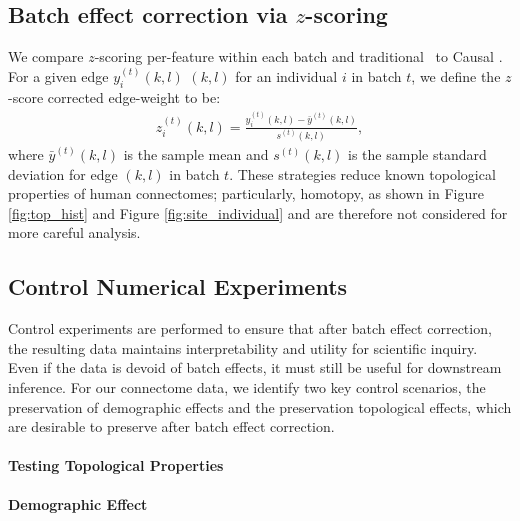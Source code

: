 \subsection{Batch effect correction via $z$-scoring}

We compare $z$-scoring per-feature within each batch \cite{Lazar2013Jul} and traditional \Combat\ to Causal \Combat. For a given edge $y_{i}^{(t)}(k,l)$ $(k, l)$ for an individual $i$ in batch $t$, we define the $z$-score corrected edge-weight to be:
\begin{align*}
    z_{i}^{(t)}(k, l) = \frac{y_i^{(t)}(k, l) - \bar y^{(t)}(k, l)}{s^{(t)}(k, l)},
\end{align*}
where $\bar y^{(t)}(k, l)$ is the sample mean and $s^{(t)}(k, l)$ is the sample standard deviation for edge $(k, l)$ in batch $t$. These strategies reduce known topological properties of human connectomes; particularly, homotopy, as shown in Figure \ref{fig:top_hist} and Figure \ref{fig:site_individual} and are therefore not considered for more careful analysis.

\subsection{Control Numerical Experiments}

Control experiments are performed to ensure that after batch effect correction, the resulting data maintains interpretability and utility for scientific inquiry. Even if the data is devoid of batch effects, it must still be useful for downstream inference. For our connectome data, we identify two key control scenarios, the preservation of demographic effects and the preservation topological effects, which are desirable to preserve after batch effect correction.

\label{app:control}
\paragraph{Testing Topological Properties}


\paragraph{Demographic Effect}

